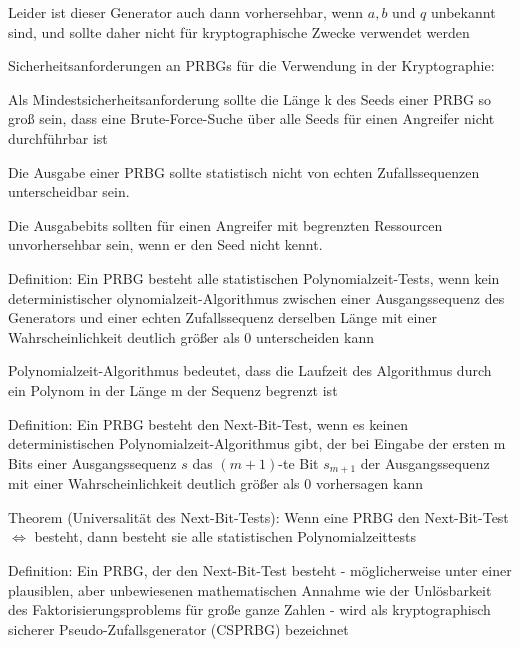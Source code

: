 \documentclass[a4paper]{article}
\begin{document}
\begin{multicols}{3}
\begin{itemize*}
\begin{itemize*}
                  \item Leider ist dieser Generator auch dann vorhersehbar, wenn $a, b$ und $q$ unbekannt sind, und sollte daher nicht für kryptographische Zwecke verwendet werden
            \end{itemize*}
            \item Sicherheitsanforderungen an PRBGs für die Verwendung in der Kryptographie:
            \begin{itemize*}
                  \item Als Mindestsicherheitsanforderung sollte die Länge k des Seeds einer PRBG so groß sein, dass eine Brute-Force-Suche über alle Seeds für einen Angreifer nicht durchführbar ist
                  \item Die Ausgabe einer PRBG sollte statistisch nicht von echten Zufallssequenzen unterscheidbar sein.
                  \item Die Ausgabebits sollten für einen Angreifer mit begrenzten Ressourcen unvorhersehbar sein, wenn er den Seed nicht kennt.
            \end{itemize*}
            \item Definition: Ein PRBG besteht alle statistischen Polynomialzeit-Tests, wenn kein deterministischer olynomialzeit-Algorithmus zwischen einer Ausgangssequenz des Generators und einer echten Zufallssequenz derselben Länge mit einer Wahrscheinlichkeit deutlich größer als 0 unterscheiden kann
            \item Polynomialzeit-Algorithmus bedeutet, dass die Laufzeit des Algorithmus durch ein Polynom in der Länge m der Sequenz begrenzt ist
            \item Definition: Ein PRBG besteht den Next-Bit-Test, wenn es keinen deterministischen Polynomialzeit-Algorithmus gibt, der bei Eingabe der ersten m Bits einer Ausgangssequenz $s$ das $(m+1)$-te Bit $s_{m+1}$ der Ausgangssequenz mit einer Wahrscheinlichkeit deutlich größer als 0 vorhersagen kann
            \item Theorem (Universalität des Next-Bit-Tests): Wenn eine PRBG den Next-Bit-Test $\Leftrightarrow$ besteht, dann besteht sie alle statistischen Polynomialzeittests
            \item Definition: Ein PRBG, der den Next-Bit-Test besteht - möglicherweise unter einer plausiblen, aber unbewiesenen mathematischen Annahme wie der Unlösbarkeit des Faktorisierungsproblems für große ganze Zahlen - wird als kryptographisch sicherer Pseudo-Zufallsgenerator (CSPRBG) bezeichnet
      \end{itemize*}


\end{multicols}
\end{document}
